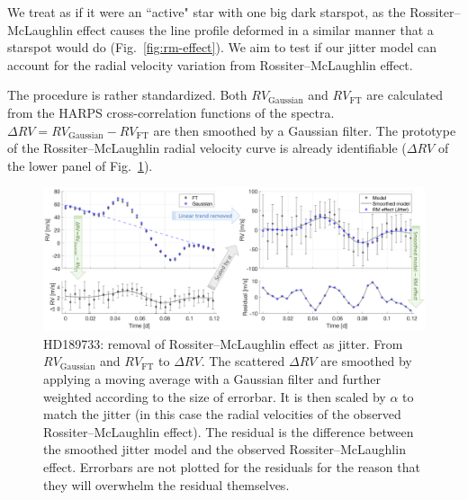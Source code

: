 We treat as if it were an ``active" star with one big dark starspot, as the Rossiter–McLaughlin effect 
causes the line profile deformed in a similar manner that a starspot would do (Fig.~\ref{fig:rm-effect}). 
We aim to test if our jitter model can account for the radial velocity variation from Rossiter–McLaughlin effect. 

The procedure is rather standardized. Both $RV_\text{Gaussian}$ and $RV_\text{FT}$ are calculated from the 
HARPS cross-correlation functions of the spectra. $\Delta RV = RV_\text{Gaussian} - RV_\text{FT}$ are then 
smoothed by a Gaussian filter. The prototype of the Rossiter–McLaughlin
radial velocity curve is already identifiable ($\Delta RV$ of the lower panel of Fig.~\ref{fig:HD189733}). 

\begin{figure}[tbp]
\centering
\includegraphics[width = 1.0 \linewidth]
{./Figures/Methods/HD189733.png}
\caption[HD189733: removal of Rossiter–McLaughlin effect as jitter]
		{HD189733: removal of Rossiter–McLaughlin effect as jitter. From $RV_\text{Gaussian}$ and $RV_\text{FT}$ to $\Delta RV$. The scattered $\Delta RV$ are smoothed by applying a moving average with a Gaussian filter and  further weighted according to the size of errorbar. It is then scaled by $\alpha$ to match the jitter (in this case the radial velocities of the observed Rossiter–McLaughlin effect). The residual is the difference between the smoothed jitter model and the observed Rossiter–McLaughlin effect. Errorbars are not plotted for the residuals for the reason that they will overwhelm the residual themselves.}
\label{fig:HD189733}
\end{figure} 


